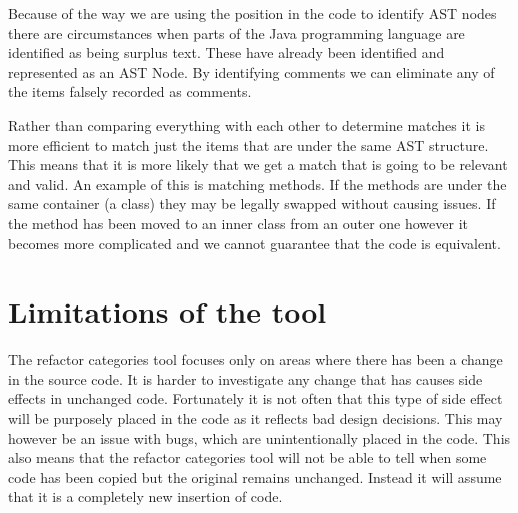 Because of the way we are using the position in the code to identify AST nodes there are circumstances when parts of the Java programming language are identified as being surplus text. These have already been identified and represented as an AST Node. By identifying comments we can eliminate any of the items falsely recorded as comments.


% 
% 

Rather than comparing everything with each other to determine matches it is more efficient to match just the items that are under the same AST structure.  This means that it is more likely that we get a match that is going to be relevant and valid.  An example of this is matching methods. If the methods are under the same container (a class) they may be legally swapped without causing issues.  If the method has been moved to an inner class from an outer one however it becomes more complicated and we cannot guarantee that the code is equivalent.  


% 

\section{Limitations of the tool}
The refactor categories tool focuses only on areas where there has been a change in the source code. 
It is harder to investigate any change that has causes side effects in unchanged code.  Fortunately it is not often that this type of side effect will be purposely placed in the code as it reflects bad design decisions.  This may however be an issue with bugs, which are unintentionally placed in the code.  
This also means that the refactor categories tool will not be able to tell when some code has been copied but the original remains unchanged. Instead it will assume that it is a completely new insertion of code.
